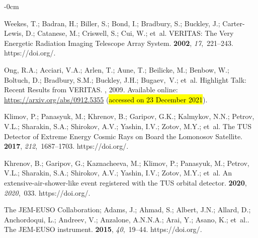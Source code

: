 \documentclass[universe,article,accept,moreauthors,pdftex]{Definitions/mdpi}
\begin{document}
\begin{adjustwidth}{-\extralength}{0cm}
\begin{thebibliography}{999}
Weekes, T.; Badran, H.; Biller, S.; Bond, I.; Bradbury, S.; Buckley, J.; Carter-Lewis, D.; Catanese, M.; Criswell, S.; Cui, W.; et~al.
\newblock VERITAS: The Very Energetic Radiation Imaging Telescope Array System.
 {\bf 2002}, {\em 17},~221--243.
\newblock
  https://doi.org/{\href{https://doi.org/10.1016/S0927-6505(01)00152-9}{}}.

Ong, R.A.; Acciari, V.A.; Arlen, T.; Aune, T.; Beilicke, M.; Benbow, W.; Boltuch, D.; Bradbury, S.M.; Buckley, J.H.;  Bugaev,~V.; et~al.
\newblock Highlight Talk: Recent Results from VERITAS.
, { 2009}. %
\newblock Available online: \url{https://arxiv.org/abs/0912.5355} (\hl{accessed on 23 December 2021}).%

Klimov, P.; Panasyuk, M.; Khrenov, B.; Garipov, G.K.; Kalmykov, N.N.; Petrov, V.L.; Sharakin, S.A.; Shirokov, A.V.; Yashin, I.V.; Zotov, M.Y.; et~al.
\newblock The TUS Detector of Extreme Energy Cosmic Rays on Board the Lomonosov
  Satellite.
 {\bf 2017}, {\em 212},~1687--1703.
\newblock
  https://doi.org/{\href{https://doi.org/10.1007/s11214-017-0403-3}{}}.

Khrenov, B.; Garipov, G.; Kaznacheeva, M.; Klimov, P.; Panasyuk, M.; Petrov, V.L.; Sharakin, S.A.; Shirokov, A.V.; Yashin, I.V.; Zotov, M.Y.; et~al.
\newblock An extensive-air-shower-like event registered with the {TUS} orbital
  detector.
 {\bf 2020}, {\em
  2020},~033.
\newblock
  https://doi.org/{\href{https://doi.org/10.1088/1475-7516/2020/03/033}{}}.

{{The JEM-EUSO Collaboration}}; Adams, J.; Ahmad, S.; Albert, J.N.; Allard, D.; Anchordoqui, L.; Andreev, V.; Anzalone, A.N.N.A.; Arai, Y.; Asano, K.; et~al..
\newblock The JEM-EUSO instrument.
 {\bf 2015}, {\em 40},~19--44.
\newblock
  https://doi.org/{\href{https://doi.org/10.1007/s10686-014-9418-x}{}}.


\end{thebibliography}
\end{adjustwidth}
\end{document}
